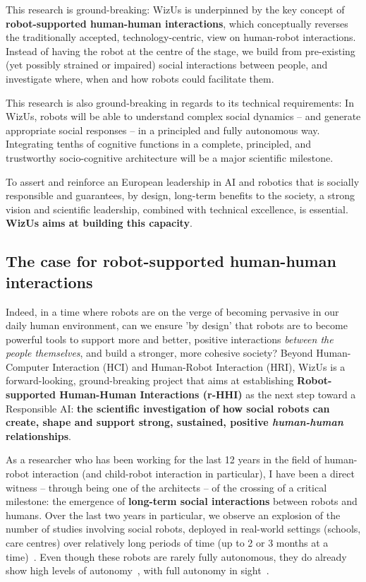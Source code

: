 \documentclass[11pt]{report}
\newcommand{\project}{WizUs\xspace}
\begin{document}
This research is ground-breaking: \project is underpinned by the key concept of
\textbf{robot-supported human-human interactions}, which conceptually reverses
the traditionally accepted, technology-centric, view on human-robot
interactions. Instead of having the robot at the centre of the stage, we build
from pre-existing (yet possibly strained or impaired) social interactions
between people, and investigate where, when and how robots could facilitate them.

This research is also ground-breaking in regards to its technical requirements:
In \project, robots will be able to understand complex social dynamics -- and
generate appropriate social responses -- in a principled and fully autonomous
way. Integrating tenths of cognitive functions in a complete, principled, and
trustworthy socio-cognitive architecture will be a major scientific milestone.

To assert and reinforce an European leadership in AI and robotics that is
socially responsible and guarantees, by design, long-term benefits to the
society, a strong vision and scientific leadership, combined with technical
excellence, is essential. \textbf{\project aims at building this capacity}. 


\subsection{The case for robot-supported human-human interactions}

Indeed, in a time where robots are on the verge of becoming pervasive in our
daily human environment, can we ensure 'by design' that robots are to become
powerful tools to support more and better, positive interactions \emph{between
the people themselves}, and build a stronger, more cohesive society? Beyond
Human-Computer Interaction (HCI) and Human-Robot Interaction (HRI), \project is
a forward-looking, ground-breaking project that aims at establishing
\textbf{Robot-supported Human-Human Interactions (r-HHI)} as the next step
toward a Responsible AI: \textbf{the scientific investigation of how social
robots can create, shape and support strong, sustained, positive
\emph{human-human} relationships}.

As a researcher who has been working for the last 12 years in the field of
human-robot interaction (and child-robot interaction in particular), I have been
a direct witness -- through being one of the architects -- of the crossing of a
critical milestone: the emergence of \textbf{long-term social interactions}
between robots and humans. Over the last two years in particular, we observe an
explosion of the number of studies involving social robots, deployed in
real-world settings (schools, care centres) over relatively long periods of time
(up to 2 or 3 months at a time)~\cite{kunze2018artificial,leite2013social}. Even
though these robots are rarely fully autonomous, they do already show high
levels of autonomy~\cite{senft2019teaching}, with full autonomy in
sight~\cite{hawes2017strands}.
\end{document}
